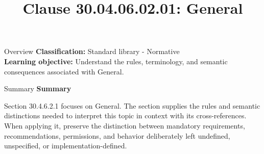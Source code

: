 \documentclass[10pt,letterpaper]{article}
\title{Clause 30.04.06.02.01: General}
\author{}
\date{}
\begin{document}
\maketitle
\begin{CornellOverviewBox}{Overview}
\textbf{Classification:} Standard library - Normative\\[2pt]
\textbf{Learning objective:} Understand the rules, terminology, and semantic consequences associated with General.
\end{CornellOverviewBox}\begin{CornellSummaryBox}{Summary}
{\sffamily\bfseries\color{Accent} Summary}\par\vspace{3pt}Section 30.4.6.2.1 focuses on General. The section supplies the rules and semantic distinctions needed to interpret this topic in context with its cross-references. When applying it, preserve the distinction between mandatory requirements, recommendations, permissions, and behavior deliberately left undefined, unspecified, or implementation-defined.
\end{CornellSummaryBox}
\end{document}
